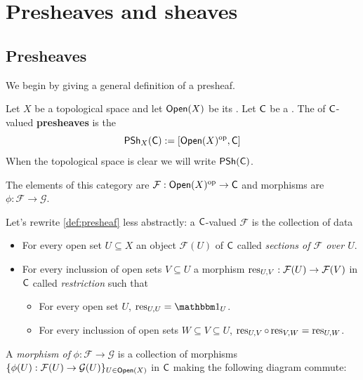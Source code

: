 \documentclass[../main.tex]{subfiles}
\begin{document}
\chapter{Presheaves and sheaves}

\section{Presheaves}
We begin by giving a general definition of a presheaf.
\begin{definition}[Presheaf] \label{def:presheaf}
  Let \(X\) be a topological space and let \(\mathsf{Open}(X)\) be its .
  Let \(\mathsf{C}\) be a .
  The  of \(\mathsf{C}\)-valued \textbf{presheaves} is the 
  \begin{equation*}
    \mathsf{PSh}_{X}(\mathsf{C}) := [\mathsf{Open}(X)^{\operatorname*{op}}, \mathsf{C}]
  \end{equation*}
  When the topological space is clear we will write \(\mathsf{PSh}(\mathsf{C})\).

  The elements of this category are  \(\mathcal{F}: \mathsf{Open}(X)^{\operatorname*{op}} \to \mathsf{C}\) and morphisms are  \(\phi: \mathcal{F} \to \mathcal{G}\).
\end{definition}

Let's rewrite \autoref{def:presheaf} less abstractly: a \(\mathsf{C}\)-valued  \(\mathcal{F}\) is the collection of data
\begin{itemize}
  \item For every open set \(U \subseteq X\) an object \(\mathcal{F}(U)\) of \(\mathsf{C}\) called \textit{sections of \(\mathcal{F}\) over \(U\)}.
  \item For every inclussion of open sets \(V \subseteq U\) a morphism \(\operatorname{res}_{U, V}: \mathcal{F}(U) \to \mathcal{F}(V)\) in \(\mathsf{C}\) called \textit{restriction} such that
        \begin{itemize}
          \item For every open set \(U\), \(\res_{U, U} = \id_{U}\).
          \item For every inclussion of open sets \(W \subseteq V \subseteq U\), \(\operatorname{res}_{U, V} \circ \operatorname{res}_{V, W} = \operatorname{res}_{U, W}\).
        \end{itemize}
\end{itemize}

A \textit{morphism of } \(\phi: \mathcal{F} \to \mathcal{G}\) is a collection of morphisms \(\{\phi(U): \mathcal{F}(U) \to \mathcal{G}(U)\}_{U \in \mathsf{Open}(X)}\) in \(\mathsf{C}\) making the following diagram commute:
\begin{center}
\end{center}
\end{document}
